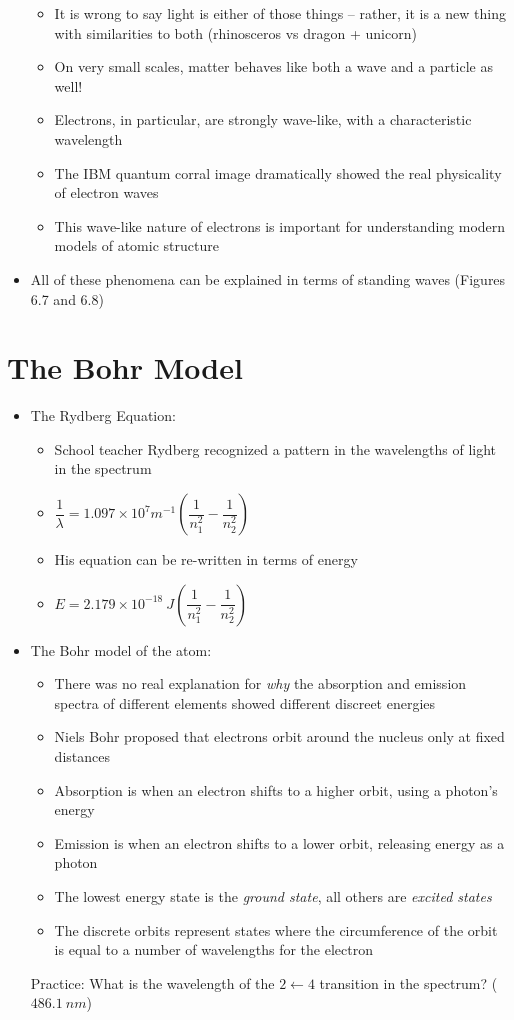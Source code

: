 \documentclass[12pt, openany, letterpaper]{memoir}
\begin{document}
\begin{itemize}
\begin{itemize}
		      \item It is wrong to say light is either of those things -- rather, it is a new thing with similarities to both (rhinosceros vs dragon + unicorn)
		      \item On very small scales, matter behaves like both a wave and a particle as well!
		      \item Electrons, in particular, are strongly wave-like, with a characteristic wavelength
		      \item The IBM quantum corral image dramatically showed the real physicality of electron waves
		      \item This wave-like nature of electrons is important for understanding modern models of atomic structure
	      \end{itemize}
  \item All of these phenomena can be explained in terms of standing waves (Figures 6.7 and 6.8)
\end{itemize}

\section{The Bohr Model}
\begin{itemize}
	\item The Rydberg Equation:
	      \begin{itemize}
		      \item School teacher Rydberg recognized a pattern in the wavelengths of light in the  spectrum
          \item $\dfrac{1}{\lambda}=1.097\times10^{7}m^{-1}\left(\dfrac{1}{n_1^2}-\dfrac{1}{n_2^2}\right)$
		      \item His equation can be re-written in terms of energy
		      \item $E=2.179\times10^{-18}~J\left(\dfrac{1}{n_1^2}-\dfrac{1}{n_2^2}\right)$
	      \end{itemize}
	\item The Bohr model of the atom:
	      \begin{itemize}
		      \item There was no real explanation for \emph{why} the absorption and emission spectra of different elements showed different discreet energies
		      \item Niels Bohr proposed that electrons orbit around the nucleus only at fixed distances
		      \item Absorption is when an electron shifts to a higher orbit, using a photon's energy
		      \item Emission is when an electron shifts to a lower orbit, releasing energy as a photon
		      \item The lowest energy state is the \emph{ground state}, all others are \emph{excited states}
		      \item The discrete orbits represent states where the circumference of the orbit is equal to a number of wavelengths for the electron
	      \end{itemize}
	      Practice: What is the wavelength of the $2\leftarrow4$ transition in the  spectrum? ($486.1~nm$)
\end{itemize}
\end{document}
